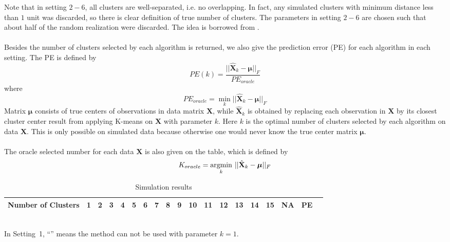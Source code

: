 \documentclass[11pt]{article}
\begin{document}
Note that in setting $2-6$, all clusters are well-separated, i.e. no overlapping. In fact, any simulated clusters with minimum distance less than $1$ unit was discarded, so there is clear definition of true number of clusters. The parameters in setting $2-6$ are chosen such that about half of the random realization were discarded. The idea is borrowed from \cite{tibshirani2001estimating}.\\\\
Besides the number of clusters selected by each algorithm is returned, we also give the prediction error (PE) for each algorithm in each setting. The PE is defined by 
\[ PE(k) = \frac{||\hat{\mathbf{X}}_k- \boldsymbol{\mu} ||_F}{PE_{oracle}} \]
where \[PE_{oracle} = \min_k ||\hat{\mathbf{X}}_k- \boldsymbol{\mu} ||_F\]
Matrix $\boldsymbol{\mu}$ consists of true centers of observations in data matrix $\mathbf{X}$, while $\hat{\mathbf{X}}_k$ is obtained by replacing each observation in $\mathbf{X}$ by its closest cluster center result from applying K-means on $\mathbf{X}$ with parameter $k$. Here $k$ is the optimal number of clusters selected by each algorithm on data $\mathbf{X}$. This is only possible on simulated data because otherwise one would never know the true center matrix $\boldsymbol{\mu}$.\\\\
The oracle selected number for each data $\mathbf{X}$ is also given on the table, which is defined by 
\[ K_{oracle} =  \underset{k}{\operatorname{argmin}}\hspace{0.05in} ||\hat{\mathbf{X}}_k- \boldsymbol{\mu} ||_F \]

\begin{table}
\centering
\caption{ \label{table1}Simulation results} 
{\scriptsize
\begin{tabular}{lcccccccccccccccccc}
\hline
Number of Clusters & 1 & 2 & 3 & 4 & 5 & 6 & 7 & 8 & 9 & 10 & 11 & 12 & 13 & 14 & 15 & NA & PE \\ \hline

\hline

\hline

\hline

\hline

\hline

\hline
\end{tabular}
}\\
\hspace{-2.0in} \footnotesize {In Setting~1, ``\textendash'' means the method can not be used with parameter $k=1$}.
\end{table}
\end{document}
